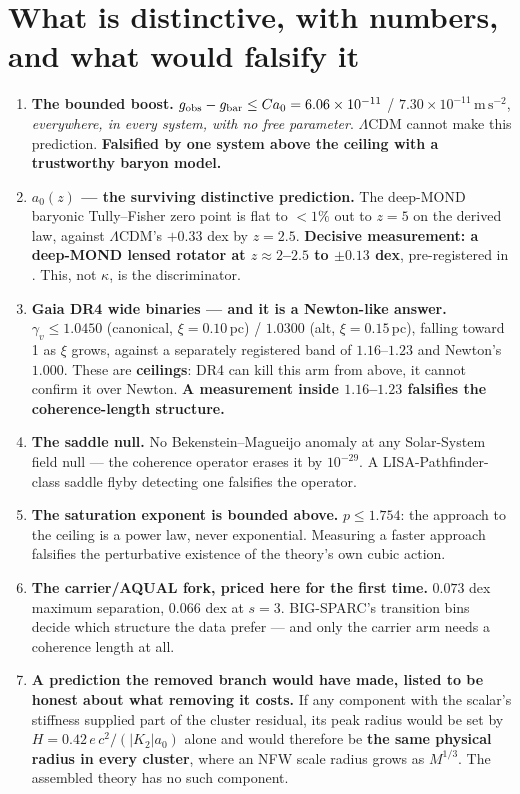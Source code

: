 \documentclass[11pt,letterpaper]{article}
\newcommand{\ms}{\,\mathrm{m\,s^{-2}}}
\begin{document}
\section{What is distinctive, with numbers, and what would falsify it}
\begin{enumerate}
\item \textbf{The bounded boost.} $g_{\rm obs}-g_{\rm bar}\le Ca_0=6.06\times10^{-11}$ / $7.30\times10^{-11}\ms$, \emph{everywhere, in every system, with no free parameter}. $\Lambda$CDM cannot make this prediction. \textbf{Falsified by one system above the ceiling with a trustworthy baryon model.}
\item \textbf{$a_0(z)$ --- the surviving distinctive prediction.} The deep-MOND baryonic Tully--Fisher zero point is flat to $<1\%$ out to $z=5$ on the derived law, against $\Lambda$CDM's $+0.33$ dex by $z=2.5$. \textbf{Decisive measurement: a deep-MOND lensed rotator at $z\approx2$--$2.5$ to $\pm0.13$ dex}, pre-registered in \cite{z22563139}. This, not $\kappa$, is the discriminator.
\item \textbf{Gaia DR4 wide binaries --- and it is a Newton-like answer.} $\gamma_v\le\mathbf{1.0450}$ (canonical, $\xi=0.10$\,pc) / $\mathbf{1.0300}$ (alt, $\xi=0.15$\,pc), falling toward 1 as $\xi$ grows, against a separately registered band of $1.16$--$1.23$ \cite{chae23,banik24} and Newton's $1.000$. These are \textbf{ceilings}: DR4 can kill this arm from above, it cannot confirm it over Newton. \textbf{A measurement inside $1.16$--$1.23$ falsifies the coherence-length structure.}
\item \textbf{The saddle null.} No Bekenstein--Magueijo anomaly \cite{bm06} at any Solar-System field null --- the coherence operator erases it by $10^{-29}$. A LISA-Pathfinder-class saddle flyby detecting one falsifies the operator.
\item \textbf{The saturation exponent is bounded above.} $p\le1.754$: the approach to the ceiling is a power law, never exponential. Measuring a faster approach falsifies the perturbative existence of the theory's own cubic action.
\item \textbf{The carrier/AQUAL fork, priced here for the first time.} $0.073$ dex maximum separation, $0.066$ dex at $s=3$. BIG-SPARC's transition bins decide which structure the data prefer --- and only the carrier arm needs a coherence length at all.
\item \textbf{A prediction the removed branch would have made, listed to be honest about what removing it costs.} If any component with the scalar's stiffness supplied part of the cluster residual, its peak radius would be set by $H=0.42\,e\,c^2/(|K_2|a_0)$ alone and would therefore be \textbf{the same physical radius in every cluster}, where an NFW scale radius grows as $M^{1/3}$. The assembled theory has no such component.
\end{enumerate}
\end{document}
